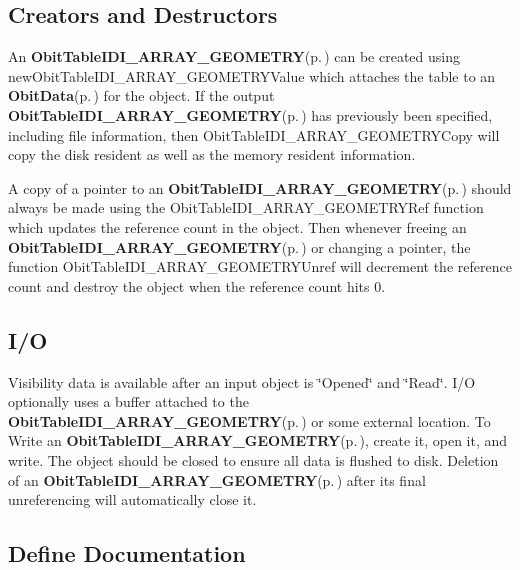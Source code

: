 \subsection{Creators and Destructors}\label{ObitTableIDI__ARRAY__GEOMETRY_8h_ObitTableIDI_ARRAY_GEOMETRYaccess}
An {\bf Obit\-Table\-IDI\_\-ARRAY\_\-GEOMETRY}{\rm (p.\,\pageref{structObitTableIDI__ARRAY__GEOMETRY})} can be created using new\-Obit\-Table\-IDI\_\-ARRAY\_\-GEOMETRYValue which attaches the table to an {\bf Obit\-Data}{\rm (p.\,\pageref{structObitData})} for the object. If the output {\bf Obit\-Table\-IDI\_\-ARRAY\_\-GEOMETRY}{\rm (p.\,\pageref{structObitTableIDI__ARRAY__GEOMETRY})} has previously been specified, including file information, then Obit\-Table\-IDI\_\-ARRAY\_\-GEOMETRYCopy will copy the disk resident as well as the memory resident information.

A copy of a pointer to an {\bf Obit\-Table\-IDI\_\-ARRAY\_\-GEOMETRY}{\rm (p.\,\pageref{structObitTableIDI__ARRAY__GEOMETRY})} should always be made using the Obit\-Table\-IDI\_\-ARRAY\_\-GEOMETRYRef function which updates the reference count in the object. Then whenever freeing an {\bf Obit\-Table\-IDI\_\-ARRAY\_\-GEOMETRY}{\rm (p.\,\pageref{structObitTableIDI__ARRAY__GEOMETRY})} or changing a pointer, the function Obit\-Table\-IDI\_\-ARRAY\_\-GEOMETRYUnref will decrement the reference count and destroy the object when the reference count hits 0.\subsection{I/O}\label{ObitTableIDI__ARRAY__GEOMETRY_8h_ObitTableIDI_ARRAY_GEOMETRYUsage}
Visibility data is available after an input object is \char`\"{}Opened\char`\"{} and \char`\"{}Read\char`\"{}. I/O optionally uses a buffer attached to the {\bf Obit\-Table\-IDI\_\-ARRAY\_\-GEOMETRY}{\rm (p.\,\pageref{structObitTableIDI__ARRAY__GEOMETRY})} or some external location. To Write an {\bf Obit\-Table\-IDI\_\-ARRAY\_\-GEOMETRY}{\rm (p.\,\pageref{structObitTableIDI__ARRAY__GEOMETRY})}, create it, open it, and write. The object should be closed to ensure all data is flushed to disk. Deletion of an {\bf Obit\-Table\-IDI\_\-ARRAY\_\-GEOMETRY}{\rm (p.\,\pageref{structObitTableIDI__ARRAY__GEOMETRY})} after its final unreferencing will automatically close it.

\subsection{Define Documentation}

